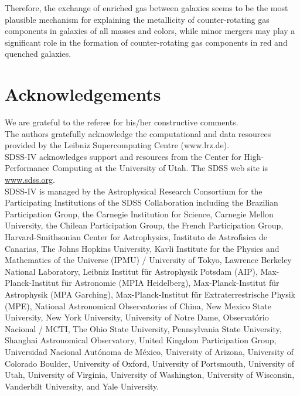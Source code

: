 \documentclass[12pt,preprint]{aa}
\begin{document}
Therefore, the exchange of enriched gas between galaxies seems to be the most plausible mechanism for explaining the metallicity of counter-rotating gas components in galaxies of all masses and colors, while minor mergers may play a significant role in the formation of counter-rotating gas components in red and quenched galaxies.


\section*{Acknowledgements}

We are grateful to the referee for his/her constructive comments. \\
The authors gratefully acknowledge the computational and data resources provided by the Leibniz Supercomputing Centre (www.lrz.de). \\
SDSS-IV acknowledges support and resources from the Center for High-Performance Computing at the University of Utah.
The SDSS web site is \href{https://www.sdss.org/}{www.sdss.org}. \\
SDSS-IV is managed by the Astrophysical Research Consortium for the 
Participating Institutions of the SDSS Collaboration including the 
Brazilian Participation Group, the Carnegie Institution for Science, Carnegie Mellon University, the Chilean Participation Group, the French Participation Group, Harvard-Smithsonian Center for Astrophysics, Instituto de Astrof\'{\i}sica de Canarias, The Johns Hopkins University, Kavli Institute for the Physics and Mathematics of the Universe (IPMU) / 
University of Tokyo, Lawrence Berkeley National Laboratory, 
Leibniz Institut f\"ur Astrophysik Potsdam (AIP),  
Max-Planck-Institut f\"ur Astronomie (MPIA Heidelberg), 
Max-Planck-Institut f\"ur Astrophysik (MPA Garching), 
Max-Planck-Institut f\"ur Extraterrestrische Physik (MPE), 
National Astronomical Observatories of China, New Mexico State University, New York University, University of Notre Dame, Observat\'orio Nacional / MCTI, The Ohio State University, Pennsylvania State University, Shanghai Astronomical Observatory, United Kingdom Participation Group, Universidad Nacional Aut\'onoma de M\'exico, University of Arizona, University of Colorado Boulder, University of Oxford, University of Portsmouth, University of Utah, University of Virginia, University of Washington, University of Wisconsin, Vanderbilt University, and Yale University. \\


 
\end{document}
